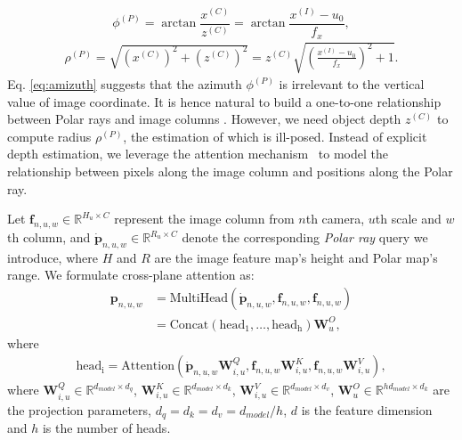 \documentclass[letterpaper]{article} \usepackage{aaai23}  \usepackage{times}  \usepackage{helvet}  \usepackage{courier}  \usepackage[hyphens]{url}  \usepackage{graphicx} \urlstyle{rm} \def\UrlFont{\rm}  \usepackage{natbib}  \usepackage{caption} \frenchspacing  \setlength{\pdfpagewidth}{8.5in} \setlength{\pdfpageheight}{11in} \usepackage{algorithm}
\begin{document}
\begin{equation}\label{eq:amizuth}
    \phi^{(P)} = \arctan \frac{x^{(C)}}{z^{(C)}} = \arctan \frac{x^{(I)}-u_0}{f_x},
\end{equation}
\begin{equation}\label{eq:radius}
\begin{split}
    \rho^{(P)} = \sqrt{(x^{(C)})^2 + (z^{(C)})^2} 
         =z^{(C)}\sqrt{(\frac{x^{(I)}-u_0}{f_x})^2+1}.
\end{split}
\end{equation}
Eq. \eqref{eq:amizuth} suggests that the azimuth $\phi^{(P)}$ is irrelevant to the vertical value of image coordinate. It is hence natural to build a one-to-one relationship between Polar rays and image columns \cite{saha2021translating}. However, we need object depth $z^{(C)}$ to compute radius $\rho^{(P)}$, the estimation of which is ill-posed. Instead of explicit depth estimation, we leverage 
the attention mechanism~\cite{vaswani2017attention} to model the relationship between pixels along the image column and positions along the Polar ray.  

Let $\mathbf{f}_{n,u,w} \in \mathbb{R}^{H_u\times C}$ represent the image column from $n$th camera, $u$th scale and $w$th column, and
$\mathbf{\dot{p}}_{n,u,w} \in \mathbb{R}^{R_u \times C}$ denote the corresponding {\em Polar ray} query we introduce, where $H$ and $R$ are the image feature map's height and Polar map's range. We formulate cross-plane attention as:
\begin{equation}
  \begin{split}
  \mathbf{p}_{n,u,w} &= \mathrm{MultiHead}(\mathbf{\dot{p}}_{n,u,w},\mathbf{f}_{n,u,w},\mathbf{f}_{n,u,w}) \\
  &= \mathrm{Concat}(\mathrm{head_1}, \dots, \mathrm{head_h})\mathbf{W}^O_u,
  \end{split}
\end{equation}
where
\begin{equation}
  \begin{split}
  \mathrm{head_i} \!=\! \mathrm{Attention}(\mathbf{\dot{p}}_{n,u,w}\mathbf{W}_{i,u}^Q, \mathbf{f}_{n,u,w}\mathbf{W}_{i,u}^K, \mathbf{f}_{n,u,w}\mathbf{W}_{i,u}^V),
  \end{split}
\end{equation}
where $\mathbf{W}_{i,u}^Q \in \mathbb{R}^{d_{model} \times d_q}$, $\mathbf{W}_{i,u}^K \in \mathbb{R}^{d_{model} \times d_k}$, $\mathbf{W}_{i,u}^V \in \mathbb{R}^{d_{model} \times d_v}$, $\mathbf{W}^O_u \in \mathbb{R}^{hd_{model} \times d_k}$
are the projection parameters, $d_q=d_k=d_v=d_{model}/h$, $d$ is the feature dimension and $h$ is the number of heads. 
\end{document}

